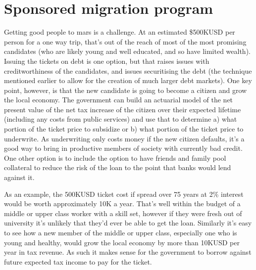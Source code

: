 \documentclass[10pt]{article}
\begin{document}
\section{Sponsored migration program}
Getting good people to mars is a challenge. At an estimated \$500KUSD per person for a one way trip, that's out of the reach of most of the most promising candidates (who are likely young and well educated, and so have limited wealth). Issuing the tickets on debt is one option, but that raises issues with creditworthiness of the candidates, and issues securitising the debt (the technique mentioned earlier to allow for the creation of much larger debt markets). One key point, however, is that the new candidate is going to become a citizen and grow the local economy. The government can build an actuarial model of the net present value of the net tax increase of the citizen over their expected lifetime (including any costs from public services) and use that to determine a) what portion of the ticket price to subsidize or b) what portion of the ticket price to underwrite. As underwriting only costs money if the new citizen defaults, it's a good way to bring in productive members of society with currently bad credit. One other option is to include the option to have friends and family pool collateral to reduce the risk of the loan to the point that banks would lend against it.

As an example, the 500KUSD ticket cost if spread over 75 years at 2\% interest would be worth approximately 10K a year. That's well within the budget of a middle or upper class worker with a skill set, however if they were fresh out of university it's unlikely that they'd ever be able to get the loan. Similarly it's easy to see how a new member of the middle or upper class, especially one who is young and healthy, would grow the local economy by more than 10KUSD per year in tax revenue. As such it makes sense for the government to borrow against future expected tax income to pay for the ticket.
\end{document}
